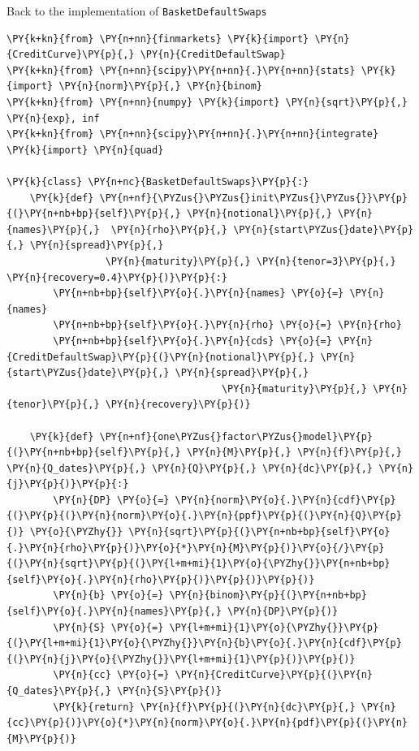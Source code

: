 Back to the implementation of \texttt{BasketDefaultSwaps}

\begin{codebox}
\begin{Verbatim}[commandchars=\\\{\}]
\PY{k+kn}{from} \PY{n+nn}{finmarkets} \PY{k}{import} \PY{n}{CreditCurve}\PY{p}{,} \PY{n}{CreditDefaultSwap}
\PY{k+kn}{from} \PY{n+nn}{scipy}\PY{n+nn}{.}\PY{n+nn}{stats} \PY{k}{import} \PY{n}{norm}\PY{p}{,} \PY{n}{binom}
\PY{k+kn}{from} \PY{n+nn}{numpy} \PY{k}{import} \PY{n}{sqrt}\PY{p}{,} \PY{n}{exp}, inf
\PY{k+kn}{from} \PY{n+nn}{scipy}\PY{n+nn}{.}\PY{n+nn}{integrate} \PY{k}{import} \PY{n}{quad}
		
\PY{k}{class} \PY{n+nc}{BasketDefaultSwaps}\PY{p}{:}
    \PY{k}{def} \PY{n+nf}{\PYZus{}\PYZus{}init\PYZus{}\PYZus{}}\PY{p}{(}\PY{n+nb+bp}{self}\PY{p}{,} \PY{n}{notional}\PY{p}{,} \PY{n}{names}\PY{p}{,}  \PY{n}{rho}\PY{p}{,} \PY{n}{start\PYZus{}date}\PY{p}{,} \PY{n}{spread}\PY{p}{,} 
                 \PY{n}{maturity}\PY{p}{,} \PY{n}{tenor=3}\PY{p}{,} \PY{n}{recovery=0.4}\PY{p}{)}\PY{p}{:}
        \PY{n+nb+bp}{self}\PY{o}{.}\PY{n}{names} \PY{o}{=} \PY{n}{names}
        \PY{n+nb+bp}{self}\PY{o}{.}\PY{n}{rho} \PY{o}{=} \PY{n}{rho}
        \PY{n+nb+bp}{self}\PY{o}{.}\PY{n}{cds} \PY{o}{=} \PY{n}{CreditDefaultSwap}\PY{p}{(}\PY{n}{notional}\PY{p}{,} \PY{n}{start\PYZus{}date}\PY{p}{,} \PY{n}{spread}\PY{p}{,} 
                                     \PY{n}{maturity}\PY{p}{,} \PY{n}{tenor}\PY{p}{,} \PY{n}{recovery}\PY{p}{)} 
		
    \PY{k}{def} \PY{n+nf}{one\PYZus{}factor\PYZus{}model}\PY{p}{(}\PY{n+nb+bp}{self}\PY{p}{,} \PY{n}{M}\PY{p}{,} \PY{n}{f}\PY{p}{,} \PY{n}{Q_dates}\PY{p}{,} \PY{n}{Q}\PY{p}{,} \PY{n}{dc}\PY{p}{,} \PY{n}{j}\PY{p}{)}\PY{p}{:}
        \PY{n}{DP} \PY{o}{=} \PY{n}{norm}\PY{o}{.}\PY{n}{cdf}\PY{p}{(}\PY{p}{(}\PY{n}{norm}\PY{o}{.}\PY{n}{ppf}\PY{p}{(}\PY{n}{Q}\PY{p}{)} \PY{o}{\PYZhy{}} \PY{n}{sqrt}\PY{p}{(}\PY{n+nb+bp}{self}\PY{o}{.}\PY{n}{rho}\PY{p}{)}\PY{o}{*}\PY{n}{M}\PY{p}{)}\PY{o}{/}\PY{p}{(}\PY{n}{sqrt}\PY{p}{(}\PY{l+m+mi}{1}\PY{o}{\PYZhy{}}\PY{n+nb+bp}{self}\PY{o}{.}\PY{n}{rho}\PY{p}{)}\PY{p}{)}\PY{p}{)}
        \PY{n}{b} \PY{o}{=} \PY{n}{binom}\PY{p}{(}\PY{n+nb+bp}{self}\PY{o}{.}\PY{n}{names}\PY{p}{,} \PY{n}{DP}\PY{p}{)}
        \PY{n}{S} \PY{o}{=} \PY{l+m+mi}{1}\PY{o}{\PYZhy{}}\PY{p}{(}\PY{l+m+mi}{1}\PY{o}{\PYZhy{}}\PY{n}{b}\PY{o}{.}\PY{n}{cdf}\PY{p}{(}\PY{n}{j}\PY{o}{\PYZhy{}}\PY{l+m+mi}{1}\PY{p}{)}\PY{p}{)}
        \PY{n}{cc} \PY{o}{=} \PY{n}{CreditCurve}\PY{p}{(}\PY{n}{Q_dates}\PY{p}{,} \PY{n}{S}\PY{p}{)}
        \PY{k}{return} \PY{n}{f}\PY{p}{(}\PY{n}{dc}\PY{p}{,} \PY{n}{cc}\PY{p}{)}\PY{o}{*}\PY{n}{norm}\PY{o}{.}\PY{n}{pdf}\PY{p}{(}\PY{n}{M}\PY{p}{)}
		

\end{Verbatim}
\end{codebox}
